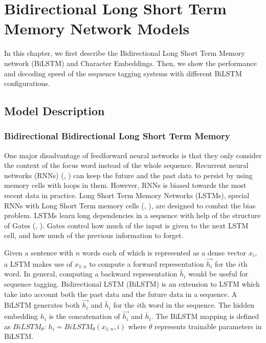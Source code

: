 \chapter{Bidirectional Long Short Term Memory Network Models}
In this chapter, we first describe the Bidirectional Long Short Term Memory network (BiLSTM) and Character Embeddings. Then, we show the performance and decoding speed of the sequence tagging systems with different BiLSTM configurations.

\section{Model Description}
\subsection{Bidirectional Bidirectional Long Short Term Memory}

One major disadvantage of feedforward neural networks is that they only consider the context of the focus word instead of the whole sequence. Recurrent neural networks (RNNs) (\citeauthor{mikolov2010recurrent}, \citeyear{mikolov2010recurrent}) can keep the future and the past data to persist by using memory cells with loops in them. However, RNNs is biased towards the most recent data in practice. Long Short Term Memory Networks (LSTMs), special RNNs with Long Short Term memory cells  (\citeauthor{graves2005framewise}, \citeyear{graves2005framewise}), are designed to combat the bias problem. LSTMs learn long dependencies in a sequence with help of the structure of Gates (\citeauthor{graves2005framewise}, \citeyear{graves2005framewise}). Gates control how much of the input is given to the next LSTM cell, and how much of the previous information to forget.

Given a sentence with $n$ words each of which is represented as a dense vector $x_i$, a LSTM makes use of $x_{1:n}$ to compute a forward representation $\overrightarrow {h_{i}}$ for the $i$th word. In general, computing a backward representation $\overleftarrow {h_{i}}$ would be useful for sequence tagging. Bidirectional LSTM (BiLSTM) is an extension to LSTM which take into account both the past data and the future data in a sequence. A BiLSTM generates both $\overrightarrow {h_{i}}$ and $\overleftarrow {h_{i}}$ for the $i$th word in the sequence. The hidden embedding $h_{i}$ is the concatenation of $\overrightarrow {h_{i}}$ and $\overleftarrow {h_{i}}$. The BiLSTM mapping is defined as $BiLSTM_{\theta}$:
$h_{i} = BiLSTM_{\theta}\left(x_{1:n}, i\right)$ where $\theta$ represents trainable parameters in BiLSTM.

